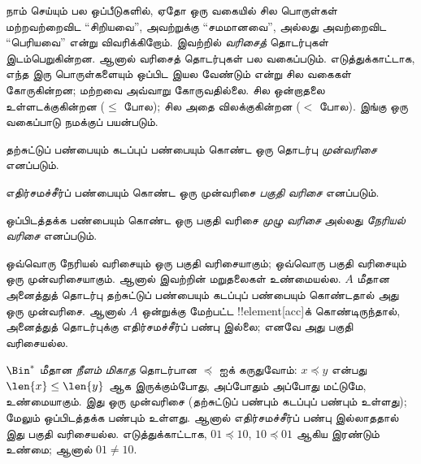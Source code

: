 \documentclass[../../../include/open-logic-section]{subfiles}
\begin{document}

\begin{explain}
நாம் செய்யும் பல ஒப்பீடுகளில், ஏதோ ஒரு வகையில் சில பொருள்கள் மற்றவற்றைவிட
“சிறியவை”, அவற்றுக்கு “சமமானவை”, அல்லது அவற்றைவிட “பெரியவை” என்று
விவரிக்கிறோம். இவற்றில் \emph{வரிசைத்} தொடர்புகள் இடம்பெறுகின்றன. ஆனால்
வரிசைத் தொடர்புகள் பல வகைப்படும். எடுத்துக்காட்டாக, எந்த இரு பொருள்களையும்
ஒப்பிட இயல வேண்டும் என்று சில வகைகள் கோருகின்றன; மற்றவை அவ்வாறு
கோருவதில்லை. சில ஒன்றாதலை உள்ளடக்குகின்றன ($\le$ போல); சில அதை
விலக்குகின்றன ($<$ போல). இங்கு ஒரு வகைப்பாடு நமக்குப் பயன்படும்.
\end{explain}

\begin{defn}[முன்வரிசை]
தற்சுட்டுப் பண்பையும் கடப்புப் பண்பையும் கொண்ட ஒரு தொடர்பு
\emph{முன்வரிசை} எனப்படும்.
\end{defn}

\begin{defn}[பகுதி வரிசை]
எதிர்சமச்சீர்ப் பண்பையும் கொண்ட ஒரு முன்வரிசை \emph{பகுதி வரிசை}
எனப்படும்.
\end{defn}

\begin{defn}[நேரியல் வரிசை]
ஒப்பிடத்தக்க பண்பையும் கொண்ட ஒரு பகுதி வரிசை \emph{முழு வரிசை}
அல்லது \emph{நேரியல் வரிசை} எனப்படும்.
\end{defn}

\begin{ex}
ஒவ்வொரு நேரியல் வரிசையும் ஒரு பகுதி வரிசையாகும்; ஒவ்வொரு பகுதி வரிசையும்
ஒரு முன்வரிசையாகும். ஆனால் இவற்றின் மறுதலைகள் உண்மையல்ல.
$A$ மீதான அனைத்துத் தொடர்பு தற்சுட்டுப் பண்பையும் கடப்புப் பண்பையும்
கொண்டதால் அது ஒரு முன்வரிசை. ஆனால் $A$ ஒன்றுக்கு மேற்பட்ட
!!{element}[acc]க் கொண்டிருந்தால், அனைத்துத் தொடர்புக்கு எதிர்சமச்சீர்ப்
பண்பு இல்லை; எனவே அது பகுதி வரிசையல்ல.
\end{ex}

\begin{ex}
$\Bin^*$ மீதான \emph{நீளம் மிகாத} தொடர்பான $\preccurlyeq$ ஐக்
கருதுவோம்: $x \preccurlyeq y$ என்பது $\len{x} \le \len{y}$ ஆக
இருக்கும்போது, அப்போதும் அப்போது மட்டுமே, உண்மையாகும். இது ஒரு
முன்வரிசை (தற்சுட்டுப் பண்பும் கடப்புப் பண்பும் உள்ளது); மேலும்
ஒப்பிடத்தக்க பண்பும் உள்ளது. ஆனால் எதிர்சமச்சீர்ப் பண்பு இல்லாததால் இது
பகுதி வரிசையல்ல. எடுத்துக்காட்டாக, $01
\preccurlyeq 10$, $10 \preccurlyeq 01$ ஆகிய இரண்டும் உண்மை; ஆனால் $01 \neq 10$.
\end{ex}
\end{document}
